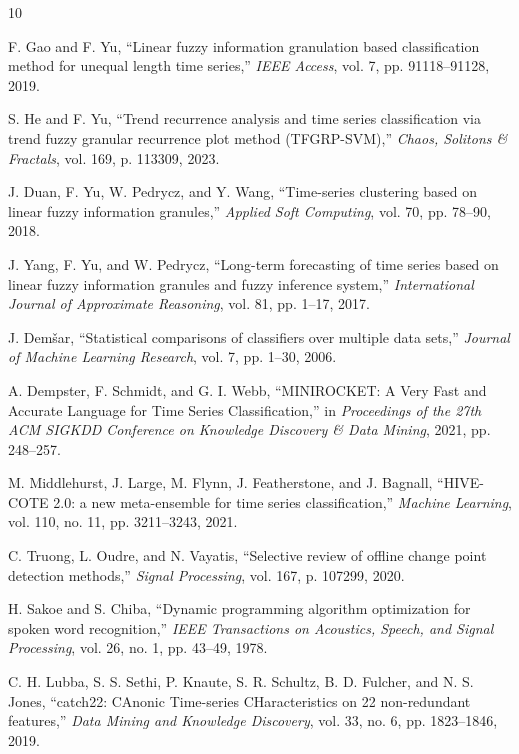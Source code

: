 \documentclass[conference]{IEEEtran}
\begin{document}
\begin{thebibliography}{10}

F. Gao and F. Yu, ``Linear fuzzy information granulation based classification method for unequal length time series,'' \textit{IEEE Access}, vol. 7, pp. 91118--91128, 2019.

S. He and F. Yu, ``Trend recurrence analysis and time series classification via trend fuzzy granular recurrence plot method (TFGRP-SVM),'' \textit{Chaos, Solitons \& Fractals}, vol. 169, p. 113309, 2023.

J. Duan, F. Yu, W. Pedrycz, and Y. Wang, ``Time-series clustering based on linear fuzzy information granules,'' \textit{Applied Soft Computing}, vol. 70, pp. 78--90, 2018.

J. Yang, F. Yu, and W. Pedrycz, ``Long-term forecasting of time series based on linear fuzzy information granules and fuzzy inference system,'' \textit{International Journal of Approximate Reasoning}, vol. 81, pp. 1--17, 2017.

J. Dem\v{s}ar, ``Statistical comparisons of classifiers over multiple data sets,'' \textit{Journal of Machine Learning Research}, vol. 7, pp. 1--30, 2006.

A. Dempster, F. Schmidt, and G. I. Webb, ``MINIROCKET: A Very Fast and Accurate Language for Time Series Classification,'' in \textit{Proceedings of the 27th ACM SIGKDD Conference on Knowledge Discovery \& Data Mining}, 2021, pp. 248--257.

M. Middlehurst, J. Large, M. Flynn, J. Featherstone, and J. Bagnall, ``HIVE-COTE 2.0: a new meta-ensemble for time series classification,'' \textit{Machine Learning}, vol. 110, no. 11, pp. 3211--3243, 2021.

C. Truong, L. Oudre, and N. Vayatis, ``Selective review of offline change point detection methods,'' \textit{Signal Processing}, vol. 167, p. 107299, 2020.

H. Sakoe and S. Chiba, ``Dynamic programming algorithm optimization for spoken word recognition,'' \textit{IEEE Transactions on Acoustics, Speech, and Signal Processing}, vol. 26, no. 1, pp. 43--49, 1978.

C. H. Lubba, S. S. Sethi, P. Knaute, S. R. Schultz, B. D. Fulcher, and N. S. Jones, ``catch22: CAnonic Time-series CHaracteristics on 22 non-redundant features,'' \textit{Data Mining and Knowledge Discovery}, vol. 33, no. 6, pp. 1823--1846, 2019.

\end{thebibliography}
\end{document}
